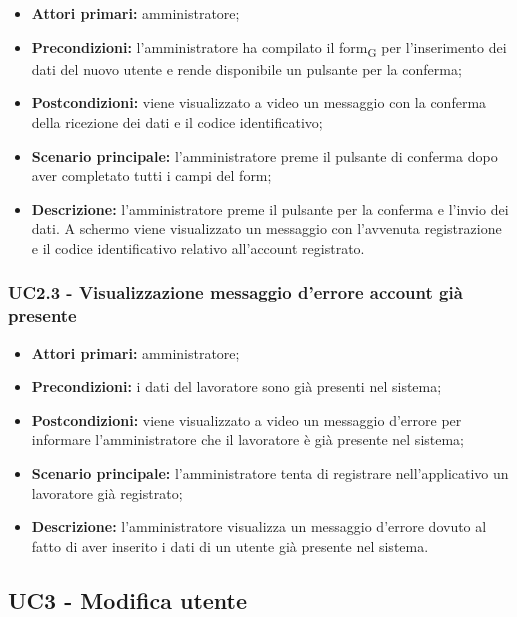 \begin{itemize}
	\item 	\textbf{Attori primari:} amministratore;
	\item 	\textbf{Precondizioni:} l’amministratore ha compilato il \gls{form}\textsubscript{G} per l’inserimento dei dati del nuovo utente e rende disponibile un pulsante per la conferma;
	\item 	\textbf{Postcondizioni:} viene visualizzato a video un messaggio con la conferma della ricezione dei dati e il codice identificativo;
	\item 	\textbf{Scenario principale:} l’amministratore preme il pulsante di conferma dopo aver completato tutti i campi del form;
	\item 	\textbf{Descrizione:} l’amministratore preme il pulsante per la conferma e l’invio dei dati. A schermo viene visualizzato un messaggio con l’avvenuta registrazione e il codice identificativo relativo all’account registrato.

\end{itemize}

\subsubsection{UC2.3 - Visualizzazione messaggio d'errore account già presente}

\begin{itemize}
	\item 	\textbf{Attori primari:} amministratore;
	\item 	\textbf{Precondizioni:} i dati del lavoratore sono già presenti nel sistema;
	\item 	\textbf{Postcondizioni:} viene visualizzato a video un messaggio d’errore per informare l’amministratore che il lavoratore è già presente nel sistema;
	\item 	\textbf{Scenario principale:} l’amministratore tenta di registrare nell’applicativo un lavoratore già registrato;
	\item 	\textbf{Descrizione:} l’amministratore visualizza un messaggio d’errore dovuto al fatto di aver inserito i dati di un utente già presente nel sistema.
\end{itemize}

\subsection{UC3 - Modifica utente}

